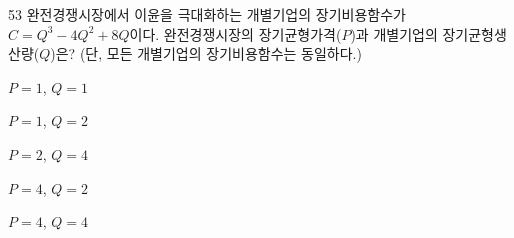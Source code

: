 \begin{question}{53}
완전경쟁시장에서 이윤을 극대화하는 개별기업의 장기비용함수가 $C = Q^3 - 4Q^2 + 8Q$이다. 완전경쟁시장의 장기균형가격($P$)과 개별기업의 장기균형생산량($Q$)은? (단, 모든 개별기업의 장기비용함수는 동일하다.)
\begin{choices}
  \item $P = 1$, $Q = 1$
  \item $P = 1$, $Q = 2$
  \item $P = 2$, $Q = 4$
  \item $P = 4$, $Q = 2$
  \item $P = 4$, $Q = 4$
\end{choices}
\end{question}
